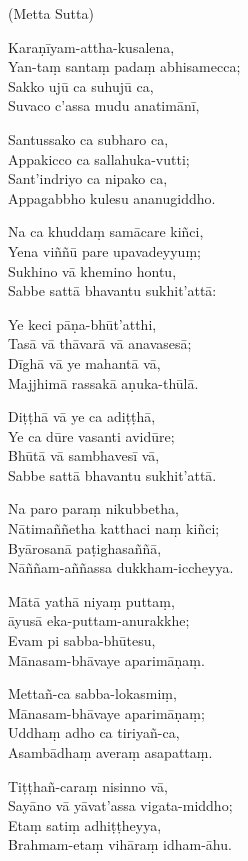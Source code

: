 (Metta Sutta)

Karaṇīyam-attha-kusalena,\\
Yan-taṃ santaṃ padaṃ abhisamecca;\\
Sakko ujū ca suhujū ca,\\
Suvaco c'assa mudu anatimānī,

Santussako ca subharo ca,\\
Appakicco ca sallahuka-vutti;\\
Sant'indriyo ca nipako ca,\\
Appagabbho kulesu ananugiddho.

Na ca khuddaṃ samācare kiñci,\\
Yena viññū pare upavadeyyuṃ;\\
Sukhino vā khemino hontu,\\
Sabbe sattā bhavantu sukhit'attā:

Ye keci pāṇa-bhūt'atthi,\\
Tasā vā thāvarā vā anavasesā;\\
Dīghā vā ye mahantā vā,\\
Majjhimā rassakā aṇuka-thūlā.

Diṭṭhā vā ye ca adiṭṭhā,\\
Ye ca dūre vasanti avidūre;\\
Bhūtā vā sambhavesī vā,\\
Sabbe sattā bhavantu sukhit'attā.

Na paro paraṃ nikubbetha,\\
Nātimaññetha katthaci naṃ kiñci;\\
Byārosanā paṭighasaññā,\\
Nāññam-aññassa dukkham-iccheyya.

Mātā yathā niyaṃ puttaṃ,\\
āyusā eka-puttam-anurakkhe;\\
Evam pi sabba-bhūtesu,\\
Mānasam-bhāvaye aparimāṇaṃ.

Mettañ-ca sabba-lokasmiṃ,\\
Mānasam-bhāvaye aparimāṇaṃ;\\
Uddhaṃ adho ca tiriyañ-ca,\\
Asambādhaṃ averaṃ asapattaṃ.

Tiṭṭhañ-caraṃ nisinno vā,\\
Sayāno vā yāvat'assa vigata-middho;\\
Etaṃ satiṃ adhiṭṭheyya,\\
Brahmam-etaṃ vihāraṃ idham-āhu.


